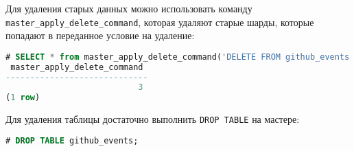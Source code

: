 Для удаления старых данных можно использовать команду \lstinline!master_apply_delete_command!, которая удаляют старые шарды, которые попадают в переданное условие на удаление:

\begin{lstlisting}[language=SQL,label=lst:citus_append4,caption=Удаление старых шардов]
# SELECT * from master_apply_delete_command('DELETE FROM github_events WHERE created_at >= ''2015-01-01 00:00:00''');
 master_apply_delete_command
-----------------------------
                           3
(1 row)
\end{lstlisting}

Для удаления таблицы достаточно выполнить \lstinline!DROP TABLE! на мастере:

\begin{lstlisting}[language=SQL,label=lst:citus_append5,caption=Удаление таблицы]
# DROP TABLE github_events;
\end{lstlisting}


